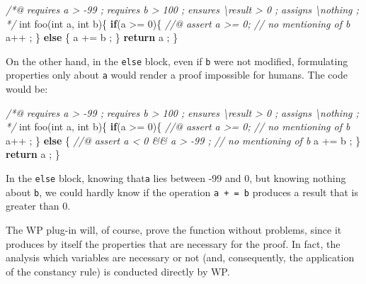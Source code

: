 \documentclass[12pt,francais,]{scrbook}
\newenvironment{Shaded}{}{}
\newcommand{\KeywordTok}[1]{\textcolor[rgb]{0.00,0.44,0.13}{\textbf{{#1}}}}
\newcommand{\DataTypeTok}[1]{\textcolor[rgb]{0.56,0.13,0.00}{{#1}}}
\newcommand{\DecValTok}[1]{\textcolor[rgb]{0.25,0.63,0.44}{{#1}}}
\newcommand{\CommentTok}[1]{\textcolor[rgb]{0.38,0.63,0.69}{\textit{{#1}}}}
\newcommand{\NormalTok}[1]{{#1}}
\begin{document}
\begin{footnotesize}\begin{Shaded}
\begin{Highlighting}[]
\CommentTok{/*@}
\CommentTok{  requires a > -99 ;}
\CommentTok{  requires b > 100 ;}
\CommentTok{  ensures  \textbackslash{}result > 0 ;}
\CommentTok{  assigns  \textbackslash{}nothing ;}
\CommentTok{*/}
\DataTypeTok{int} \NormalTok{foo(}\DataTypeTok{int} \NormalTok{a, }\DataTypeTok{int} \NormalTok{b)\{}
  \KeywordTok{if}\NormalTok{(a >= }\DecValTok{0}\NormalTok{)\{}
    \CommentTok{//@ assert a >= 0; // no mentioning of b}
    \NormalTok{a++ ;}
  \NormalTok{\} }\KeywordTok{else} \NormalTok{\{}
    \NormalTok{a += b ;}
  \NormalTok{\}}
  \KeywordTok{return} \NormalTok{a ;}
\NormalTok{\}}
\end{Highlighting}
\end{Shaded}\end{footnotesize}

On the other hand, in the \texttt{else} block, even if \texttt{b} were
not modified, formulating properties only about \texttt{a} would render
a proof impossible for humans. The code would be:

\begin{footnotesize}\begin{Shaded}
\begin{Highlighting}[]
\CommentTok{/*@}
\CommentTok{  requires a > -99 ;}
\CommentTok{  requires b > 100 ;}
\CommentTok{  ensures  \textbackslash{}result > 0 ;}
\CommentTok{  assigns  \textbackslash{}nothing ;}
\CommentTok{*/}
\DataTypeTok{int} \NormalTok{foo(}\DataTypeTok{int} \NormalTok{a, }\DataTypeTok{int} \NormalTok{b)\{}
  \KeywordTok{if}\NormalTok{(a >= }\DecValTok{0}\NormalTok{)\{}
    \CommentTok{//@ assert a >= 0; // no mentioning of b}
    \NormalTok{a++ ;}
  \NormalTok{\} }\KeywordTok{else} \NormalTok{\{}
    \CommentTok{//@ assert a < 0 && a > -99 ; // no mentioning of b}
    \NormalTok{a += b ;}
  \NormalTok{\}}
  \KeywordTok{return} \NormalTok{a ;}
\NormalTok{\}}
\end{Highlighting}
\end{Shaded}\end{footnotesize}

In the \texttt{else} block, knowing that\texttt{a} lies between -99 and
0, but knowing nothing about \texttt{b}, we could hardly know if the
operation \texttt{a\ +\ =\ b} produces a result that is greater than 0.

The WP plug-in will, of course, prove the function without problems,
since it produces by itself the properties that are necessary for the
proof. In fact, the analysis which variables are necessary or not (and,
consequently, the application of the constancy rule) is conducted
directly by WP.
\end{document}
